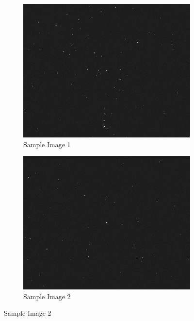 \documentclass[../../main.tex]{subfiles}
\begin{document}
\begin{figure}[h!]
    \centering
    \begin{subfigure}[b]{0.45\textwidth}
        \centering
        \includegraphics[width=\textwidth]{Figures/Model/Sample Images/Image_1.png}
        \caption{Sample Image 1}
        \label{fig:sample_1}
    \end{subfigure}
    \hfill
    \begin{subfigure}[b]{0.45\textwidth}
        \centering
        \includegraphics[width=\textwidth]{Figures/Model/Sample Images/Image_2.png}
        \caption{Sample Image 2}
        \label{fig:sample_2}

\end{subfigure}
\end{figure}
\end{document}
